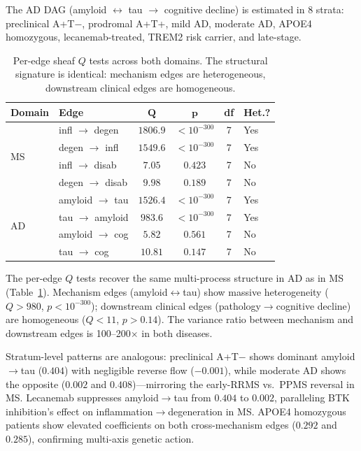 \documentclass[11pt]{article}
\begin{document}
The AD DAG (amyloid $\leftrightarrow$ tau $\to$ cognitive decline) is estimated in 8 strata: preclinical A+T$-$, prodromal A+T+, mild AD, moderate AD, APOE4 homozygous, lecanemab-treated, TREM2 risk carrier, and late-stage.

\begin{table}[t]
\centering
\caption{Per-edge sheaf $Q$ tests across both domains. The structural signature is identical: mechanism edges are heterogeneous, downstream clinical edges are homogeneous.}
\label{tab:dag-cross}
\small
\begin{tabular}{@{}llcccl@{}}
\toprule
\textbf{Domain} & \textbf{Edge} & $\boldsymbol{Q}$ & $\boldsymbol{p}$ & \textbf{df} & \textbf{Het.?} \\
\midrule
\multirow{4}{*}{MS} & infl $\to$ degen & $1806.9$ & $< 10^{-300}$ & 7 & Yes \\
& degen $\to$ infl & $1549.6$ & $< 10^{-300}$ & 7 & Yes \\
& infl $\to$ disab & $7.05$ & $0.423$ & 7 & No \\
& degen $\to$ disab & $9.98$ & $0.189$ & 7 & No \\
\midrule
\multirow{4}{*}{AD} & amyloid $\to$ tau & $1526.4$ & $< 10^{-300}$ & 7 & Yes \\
& tau $\to$ amyloid & $983.6$ & $< 10^{-300}$ & 7 & Yes \\
& amyloid $\to$ cog & $5.82$ & $0.561$ & 7 & No \\
& tau $\to$ cog & $10.81$ & $0.147$ & 7 & No \\
\bottomrule
\end{tabular}
\end{table}

The per-edge $Q$ tests recover the same multi-process structure in AD as in MS (Table~\ref{tab:dag-cross}).
Mechanism edges (amyloid$\leftrightarrow$tau) show massive heterogeneity ($Q > 980$, $p < 10^{-300}$); downstream clinical edges (pathology$\to$cognitive decline) are homogeneous ($Q < 11$, $p > 0.14$).
The variance ratio between mechanism and downstream edges is 100--200$\times$ in both diseases.

Stratum-level patterns are analogous: preclinical A+T$-$ shows dominant amyloid$\to$tau ($0.404$) with negligible reverse flow ($-0.001$), while moderate AD shows the opposite ($0.002$ and $0.408$)---mirroring the early-RRMS vs.\ PPMS reversal in MS.
Lecanemab suppresses amyloid$\to$tau from $0.404$ to $0.002$, paralleling BTK inhibition's effect on inflammation$\to$degeneration in MS.
APOE4 homozygous patients show elevated coefficients on both cross-mechanism edges ($0.292$ and $0.285$), confirming multi-axis genetic action.
\end{document}

